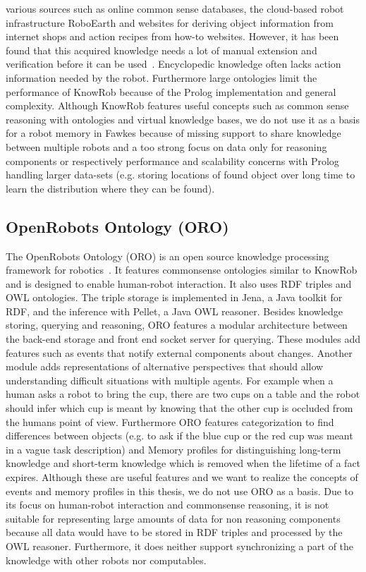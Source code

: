 \documentclass[a4paper,11pt]{article}
\begin{document}
various sources such as online common sense databases, the cloud-based
robot infrastructure RoboEarth and websites for
deriving object information from internet shops and action recipes
from how-to websites. However, it has been found that this acquired
knowledge needs a lot of manual extension and verification before it
can be used~\cite{KnowRob-Web}. Encyclopedic knowledge often lacks
action information needed by the robot. %
Furthermore large
ontologies limit the performance of KnowRob because of the Prolog
implementation and general complexity. Although KnowRob features
useful concepts such as common sense reasoning with ontologies and
virtual knowledge bases, we do not use it as a basis for a robot memory
in Fawkes because of missing support to share knowledge between multiple
robots and a too strong focus on data only for reasoning components or
respectively performance and scalability concerns with Prolog handling
larger data-sets (e.g. storing locations of found object over long time
to learn the distribution where they can be found).

\subsection{OpenRobots Ontology (ORO)}
\label{sec:oro}
The OpenRobots Ontology (ORO) is an open source knowledge processing
framework for robotics~\cite{Oro}. It features commonsense ontologies
similar to KnowRob and is designed to enable human-robot
interaction. It also uses RDF triples and OWL ontologies. The triple
storage is implemented in Jena, a Java toolkit for RDF, and the
inference with Pellet, a Java OWL reasoner. Besides knowledge storing,
querying and reasoning, ORO features a modular architecture between
the back-end storage and front end socket server for querying. These
modules add features such as events that notify external components
about changes.
Another module adds representations of alternative
perspectives that should allow understanding difficult situations with
multiple agents. For example when a human asks a robot to bring the
cup, there are two cups on a table and the robot should infer which
cup is meant by knowing that the other cup is occluded from the humans
point of view. Furthermore ORO features categorization to find
differences between objects (e.g. to ask if the blue cup or the red
cup was meant in a vague task description) and Memory profiles for
distinguishing long-term knowledge and short-term knowledge which is
removed when the lifetime of a fact expires. Although these are useful
features and we want to realize the concepts of events and memory
profiles in this thesis, we do not use ORO as a basis. Due to its
focus on human-robot interaction and commonsense reasoning, it is not
suitable for representing large amounts of data for non reasoning
components because all data would have to be stored in RDF triples and
processed by the OWL reasoner. Furthermore, it does neither support
synchronizing a part of the knowledge with other robots nor computables.
\end{document}
